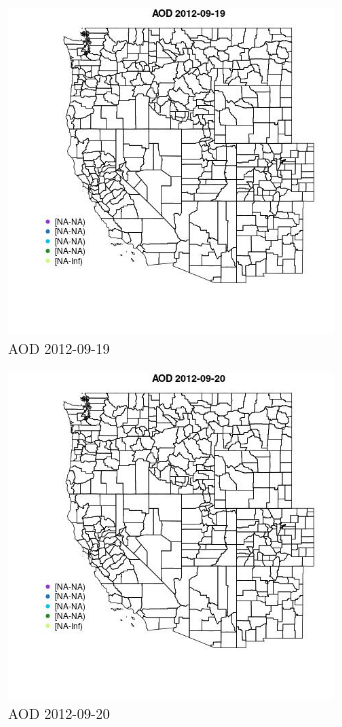 \clearpage 

\begin{figure} 
\centering  
\includegraphics[width=0.77\textwidth]{Code_Outputs/ML_input_report_ML_input_PM25_Step5_part_d_de_duplicated_aves_ML_input_MapObsAOD2012-09-19.jpg} 
\caption{\label{fig:ML_input_report_ML_input_PM25_Step5_part_d_de_duplicated_aves_ML_inputMapObsAOD2012-09-19}AOD 2012-09-19} 
\end{figure} 
 

\begin{figure} 
\centering  
\includegraphics[width=0.77\textwidth]{Code_Outputs/ML_input_report_ML_input_PM25_Step5_part_d_de_duplicated_aves_ML_input_MapObsAOD2012-09-20.jpg} 
\caption{\label{fig:ML_input_report_ML_input_PM25_Step5_part_d_de_duplicated_aves_ML_inputMapObsAOD2012-09-20}AOD 2012-09-20} 
\end{figure} 
 

